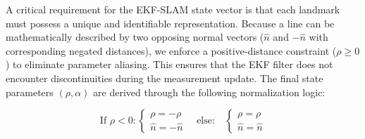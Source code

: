 \documentclass[11pt]{article}
\begin{document}
A critical requirement for the EKF-SLAM state vector is that each landmark must possess a unique and identifiable representation. Because a line can be mathematically described by two opposing normal vectors ($\hat{n}$ and $-\hat{n}$ with corresponding negated distances), we enforce a positive-distance constraint ($\rho \geq 0$) to eliminate parameter aliasing. This ensures that the EKF filter does not encounter discontinuities during the measurement update. The final state parameters $(\rho, \alpha)$ are derived through the following normalization logic:

\begin{equation}
	\text{If } \rho < 0: 
	\begin{cases} 
		\rho = -\rho \\
		\hat{n} = -\hat{n} 
	\end{cases}
	\quad \text{else:} \quad
	\begin{cases} 
		\rho = \rho \\
		\hat{n} = \hat{n} 
	\end{cases}
\end{equation}
\end{document}
